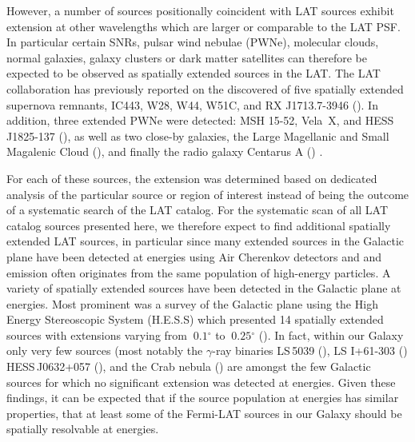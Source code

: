 \documentclass[12pt,preprint]{aastex}
\newcommand{\gev}{\text{GeV}\xspace}
\newcommand{\tev}{\text{TeV}\xspace}
\renewcommand{\deg}{\ensuremath{^\circ}\xspace}
\begin{document}
However, a number of sources positionally coincident with LAT sources
exhibit extension at other wavelengths which are larger or comparable to
the LAT PSF.  In particular certain SNRs, pulsar wind nebulae (PWNe),
molecular clouds, normal galaxies, galaxy clusters or dark matter
satellites can therefore be expected to be observed as spatially extended
sources in the LAT.  The LAT collaboration has previously reported on the
discovered of five spatially extended supernova remnants, IC443, W28, W44,
W51C, and RX J1713.7-3946 (\cite{ic443,w28,w44,w51c,rx_j1713_lat}). In
addition, three extended PWNe were detected: MSH 15-52, Vela~X,
and HESS\,J1825-137 (\cite{msh1552,velax,fermi_hess_j1825}), as well
as two close-by galaxies, the Large Magellanic and Small Magalenic
Cloud (\cite{lmc,smc}), and finally the radio galaxy Centarus A
(\cite{cen_a_lat}) .

For each of these sources, the extension was determined based on
dedicated analysis of the particular source or region of interest
instead of being the outcome of a systematic search of the LAT catalog.
For the systematic scan of all LAT catalog sources presented here, we
therefore expect to find additional spatially extended LAT sources, in
particular since many extended sources in the Galactic plane have been
detected at \tev energies using Air Cherenkov detectors and \tev and
\gev emission often originates from the same population of high-energy
particles.  A variety of spatially extended sources have been detected
in the Galactic plane at \tev energies. Most prominent was a survey of
the Galactic plane using the High Energy Stereoscopic System (H.E.S.S)
which presented 14 spatially extended sources
 with extensions varying from
$~0.1\deg$ to $~0.25\deg$ (\cite{hess_plane_survey}). In fact, within
our Galaxy only very few sources (most notably the $\gamma$-ray binaries
LS\,5039 (\cite{HESSLS5039}), LS I+61-303 (\cite{MAGICLSI, VERITASLSI})
HESS\,J0632+057 (\cite{HESS0632}), and the Crab nebula (\cite{crab_weekes})
are amongst the few Galactic sources
for which no significant extension was detected at \tev energies. Given
these findings, it can be expected that if the source population at \gev
energies has similar properties, that at least some of the Fermi-LAT
sources in our Galaxy should be spatially resolvable at \gev energies.

\end{document}
